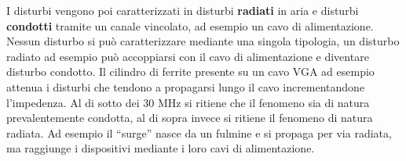 \documentclass[a4paper,11pt]{scrartcl}
\begin{document}
I disturbi vengono poi caratterizzati in disturbi \textbf{radiati} in aria e disturbi \textbf{condotti} tramite
un canale vincolato, ad esempio un cavo di alimentazione.
Nessun disturbo si può caratterizzare mediante una singola tipologia, %
un disturbo radiato ad esempio può accoppiarsi con il cavo di alimentazione e diventare disturbo condotto.
Il cilindro di ferrite presente su un cavo VGA ad esempio attenua i disturbi che tendono a propagarsi lungo il cavo
incrementandone l'impedenza.
\newpage
Al di sotto dei 30 MHz si ritiene che il fenomeno sia di natura prevalentemente condotta,
al di sopra invece si ritiene il fenomeno di natura radiata. Ad esempio il ``surge'' nasce da un fulmine e si
propaga per via radiata, ma raggiunge i dispositivi mediante i loro cavi di alimentazione.
\end{document}

